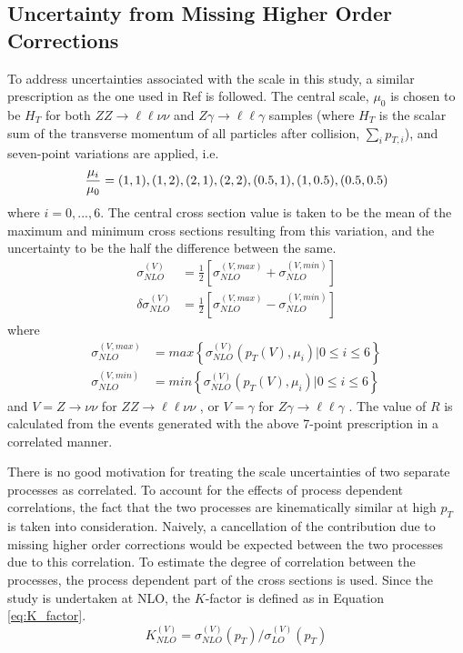\documentclass[11pt,a4paper,openright,twoside]{report}
\newcommand{\ZZ}{$ZZ\to \ell\ell\nu\nu$ }
\newcommand{\Zg}{$Z\gamma\to \ell\ell\gamma$ }
\begin{document}
\subsection{Uncertainty from Missing Higher Order Corrections}
To address uncertainties associated with the scale in this study, a similar prescription as the one used in Ref \cite{precise_scale} is followed. The central scale, $\mu_0$ is chosen to be $H_{T}$ for both \ZZ and \Zg samples (where $H_T$ is the scalar sum of the transverse momentum of all particles after collision, $\sum_{i} p_{T,i}$), and seven-point variations are applied, i.e.
\begin{equation}
\frac{\mu_i}{\mu_0} = (1,1),(1,2),(2,1),(2,2),(0.5,1),(1,0.5),(0.5,0.5)\\
\label{eq:scale}
\end{equation}
where $i=0,...,6$. The central cross section value is taken to be the mean of the maximum and minimum cross sections resulting from this variation, and the uncertainty to be the half the difference between the same.
\begin{align}
\sigma_{NLO}^{(V)} &= \frac{1}{2}\left[\sigma_{NLO}^{(V,max)} + \sigma_{NLO}^{(V,min)}\right]\label{eq:scale_central}\\
\delta\sigma_{NLO}^{(V)} &= \frac{1}{2}\left[\sigma_{NLO}^{(V,max)} - \sigma_{NLO}^{(V,min)}\right]\label{eq:scale_central2}
\end{align}
where
\begin{align}
\sigma_{NLO}^{(V,max)} &= max\left\lbrace\sigma_{NLO}^{(V)}(p_{T}(V),\mu_i)|0\leq i \leq 6\right\rbrace\\
\sigma_{NLO}^{(V,min)} &= min\left\lbrace\sigma_{NLO}^{(V)}(p_{T}(V),\mu_i)|0\leq i \leq 6\right\rbrace
\end{align}
and $V = Z\to\nu\nu$ for \ZZ, or $V = \gamma$ for \Zg. The value of $R$ is calculated from the events generated with the above 7-point prescription in a correlated manner.

There is no good motivation for treating the scale uncertainties of two separate processes as correlated. To account for the effects of process dependent correlations, the fact that the two processes are kinematically similar at high $p_T$ is taken into consideration. Naively, a cancellation of the contribution due to missing higher order corrections would be expected between the two processes due to this correlation. To estimate the degree of correlation between the processes, the process dependent part of the cross sections is used. Since the study is undertaken at NLO, the $K$-factor is defined as in Equation \ref{eq:K_factor}.
\begin{equation}
K_{NLO}^{(V)} = \sigma_{NLO}^{(V)}(p_T)/\sigma_{LO}^{(V)}(p_T)
\label{eq:K_factor}
\end{equation}
\end{document}
